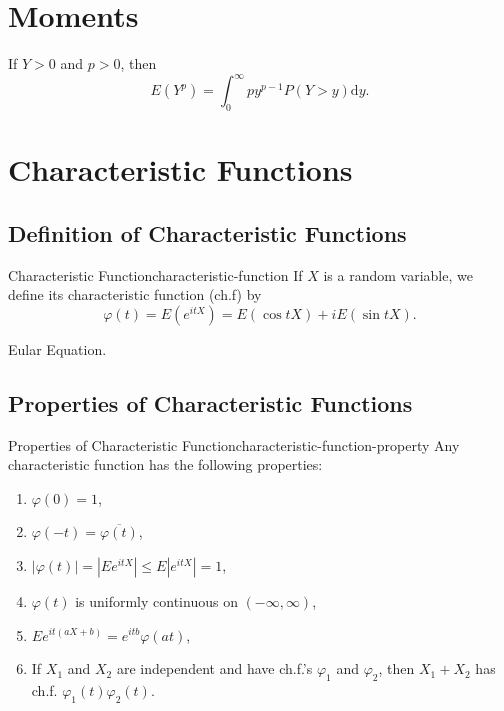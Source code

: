 \section{Moments}

\begin{lemma}{}{}
    If $Y>0$ and $p>0$, then
    \begin{equation}
        E(Y^p)=\int_{0}^{\infty}py^{p-1}P(Y>y)\mathrm{d}y.
    \end{equation}
\end{lemma}

\section{Characteristic Functions}

\subsection{Definition of Characteristic Functions}

\begin{definition}{Characteristic Function}{characteristic-function}
    If $X$ is a random variable, we define its characteristic function (ch.f) by
    \begin{equation}
        \varphi(t)=E\left(e^{itX}\right)=E\left(\cos tX\right)+i E\left(\sin tX\right).
    \end{equation}
\end{definition}

\begin{note}
    Eular Equation.
\end{note}

\subsection{Properties of Characteristic Functions}

\begin{theorem}{Properties of Characteristic Function}{characteristic-function-property}
    Any characteristic function has the following properties:
    \begin{enumerate}
        \item $\varphi(0) = 1$,
        \item $\varphi(-t) = \overline{\varphi(t)}$,
        \item $|\varphi(t)| =|Ee^{itX}| \leq E|e^{itX}| = 1$,
        \item $\varphi(t)$ is uniformly continuous on $(-\infty,\infty)$,
        \item $Ee^{it(aX+b)}=e^{itb}\varphi(at)$,
        \item  If $X_1$ and $X_2$ are independent and have ch.f.'s $\varphi_1$ and $\varphi_2$, then $X_1+X_2$ has ch.f. $\varphi_1(t)\varphi_2(t)$.
    \end{enumerate}
\end{theorem}


